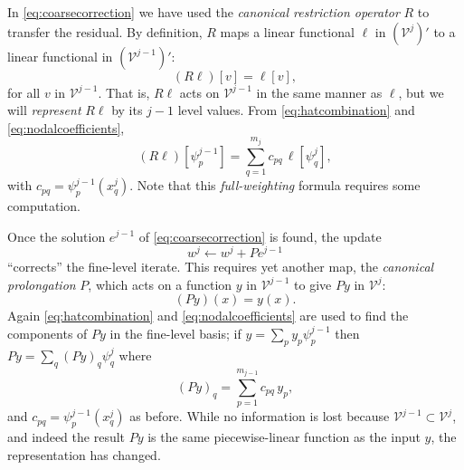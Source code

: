 \documentclass[letterpaper,final,12pt,reqno]{amsart}
\theoremstyle{claim}
\numberwithin{equation}{section}
\numberwithin{figure}{section}
\numberwithin{table}{section}
\numberwithin{theorem}{section}
\begin{document}
In \eqref{eq:coarsecorrection} we have used the \emph{canonical restriction operator} $R$ to transfer the residual.  By definition, $R$ maps a linear functional $\ell$ in $(\mathcal{V}^j)'$ to a linear functional in $(\mathcal{V}^{j-1})'$:
\begin{equation}
  (R \ell)[v] = \ell[v], \label{eq:canonicalrestriction}
\end{equation}
for all $v$ in $\mathcal{V}^{j-1}$.  That is, $R \ell$ acts on $\mathcal{V}^{j-1}$ in the same manner as $\ell$, but we will \emph{represent} $R\ell$ by its $j-1$ level values.  From \eqref{eq:hatcombination} and \eqref{eq:nodalcoefficients},
\begin{equation}
  (R \ell)[\psi_p^{j-1}] = \sum_{q=1}^{m_j} c_{pq}\, \ell[\psi_q^j], \label{eq:canonicalrestrictionaction}
\end{equation}
with $c_{pq}=\psi_p^{j-1}(x_q^j)$.  Note that this \emph{full-weighting} formula \cite{Briggsetal2000} requires some computation.

Once the solution $e^{j-1}$ of \eqref{eq:coarsecorrection} is found, the update
\begin{equation}
  w^j \gets w^j + P e^{j-1}  \label{eq:update}
\end{equation}
``corrects'' the fine-level iterate.  This requires yet another map, the \emph{canonical prolongation} $P$, which acts on a function $y$ in $\mathcal{V}^{j-1}$ to give $Py$ in $\mathcal{V}^j$:
\begin{equation}
  (P y)(x) = y(x). \label{eq:canonicalprolongation}
\end{equation}
Again \eqref{eq:hatcombination} and \eqref{eq:nodalcoefficients} are used to find the components of $Py$ in the fine-level basis; if $y=\sum_p y_p \psi_p^{j-1}$ then $Py = \sum_q (Py)_q \psi_q^j$ where
\begin{equation}
  (Py)_q = \sum_{p=1}^{m_{j-1}} c_{pq}\, y_p, \label{eq:canonicalprolongationaction}
\end{equation}
and $c_{pq} = \psi_p^{j-1}(x_q^j)$ as before.  While no information is lost because $\mathcal{V}^{j-1} \subset \mathcal{V}^j$, and indeed the result $P y$ is the same piecewise-linear function as the input $y$, the representation has changed.
\end{document}
